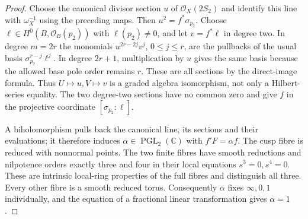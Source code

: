 \begin{proof}
Choose the canonical divisor section $u$ of $\mathcal O_X(2S_2)$ and identify this line with $\omega_X^{-1}$ using the preceding maps. Then $u^2=f^*\sigma_{p_2}$. Choose $\ell\in H^0(B,\mathcal O_B(p_2))$ with $\ell(p_2)\ne0$, and let $v=f^*\ell$ in degree two. In degree $m=2r$ the monomials $u^{2r-2j}v^j$, $0\le j\le r$, are the pullbacks of the usual basis $\sigma_{p_2}^{r-j}\ell^j$. In degree $2r+1$, multiplication by $u$ gives the same basis because the allowed base pole order remains $r$. These are all sections by the direct-image formula. Thus $U\mapsto u,V\mapsto v$ is a graded algebra isomorphism, not only a Hilbert-series equality. The two degree-two sections have no common zero and give $f$ in the projective coordinate $[\sigma_{p_2}:\ell]$.

A biholomorphism pulls back the canonical line, its sections and their evaluations; it therefore induces $\alpha\in\operatorname{PGL}_2(\mathbb C)$ with $f'F=\alpha f$. The cusp fibre is reduced with nonnormal points. The two finite fibres have smooth reductions and nilpotence orders exactly three and four in their local equations $s^3=0,s^4=0$. These are intrinsic local-ring properties of the full fibres and distinguish all three. Every other fibre is a smooth reduced torus. Consequently $\alpha$ fixes $\infty,0,1$ individually, and the equation of a fractional linear transformation gives $\alpha=1$.
\end{proof}

